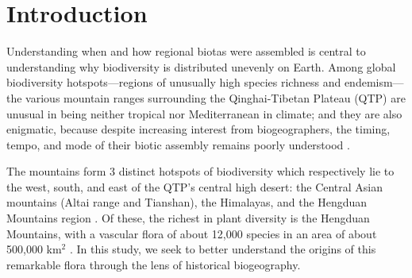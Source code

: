 \section{Introduction}


Understanding when and how regional biotas were assembled is central to understanding why biodiversity is distributed unevenly on Earth. Among global biodiversity hotspots---regions of unusually high species richness and endemism---the various mountain ranges surrounding the Qinghai-Tibetan Plateau (QTP) are unusual in being neither tropical nor Mediterranean in climate; and they are also enigmatic, because despite increasing interest from biogeographers, the timing, tempo, and mode of their biotic assembly remains poorly understood \citep{Favre2015,Wen2014}.

The mountains form 3 distinct hotspots of biodiversity which respectively lie to the west, south, and east of the QTP's central high desert: the Central Asian mountains (Altai range and Tianshan), the Himalayas, and the Hengduan Mountains region \citep{Favre2015}. Of these, the richest in plant diversity is the Hengduan Mountains, with a vascular flora of about 12,000 species in an area of about 500,000 km$^2$ \citep{Boufford2014,LiEtLi1993,Wu1988}. In this study, we seek to better understand the origins of this remarkable flora through the lens of historical biogeography.


